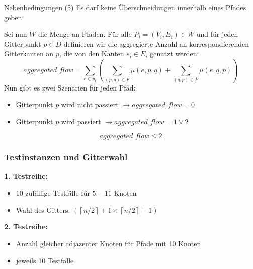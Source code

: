 \documentclass[9pt]{beamer}
\begin{document}
    \begin{frame}{Nebenbedingungen}
        (5) Es darf keine Überschneidungen innerhalb eines Pfades geben: \newline \par 
        Sei nun $W$ die Menge an Pfaden. Für alle $P_i =(V_i, E_i) \in W$ und für jeden Gitterpunkt $p \in D$ definieren wir die aggregierte Anzahl an korrespondierenden Gitterkanten an $p$, die von den Kanten $e_i \in E_i$ genutzt werden: $$aggregated\_flow = \sum_{e \in p_i}(\sum_{(p,q) \in F} \mu(e,p,q) + \sum_{(q,p) \in F} \mu(e,q,p))$$ \pause
        Nun gibt es zwei Szenarien für jeden Pfad:
        \begin{itemize}
            \item Gitterpunkt $p$ wird nicht passiert $\rightarrow aggregated\_flow = 0$
            \item Gitterpunkt $p$ wird passiert $\rightarrow aggregated\_flow = 1 \lor 2$
        \end{itemize}
        $$aggregated\_flow \leq 2$$
    \end{frame}

    \begin{frame}
    \frametitle{Testinstanzen und Gitterwahl}
    \textbf{1. Testreihe:}
    \begin{itemize}
        \item 10 zufällige Testfälle für $5-11$ Knoten
        \item Wahl des Gitters: $(\left\lceil n/2 \right\rceil+1 \times \left\lceil n/2 
        \right\rceil+1)$\pause 
        \end{itemize}
        \textbf{2. Testreihe:}
        \begin{itemize}
        \item Anzahl gleicher adjazenter Knoten für Pfade mit 10 Knoten
        \item jeweils 10 Testfälle
    \end{itemize}
    \end{frame}
\end{document}

